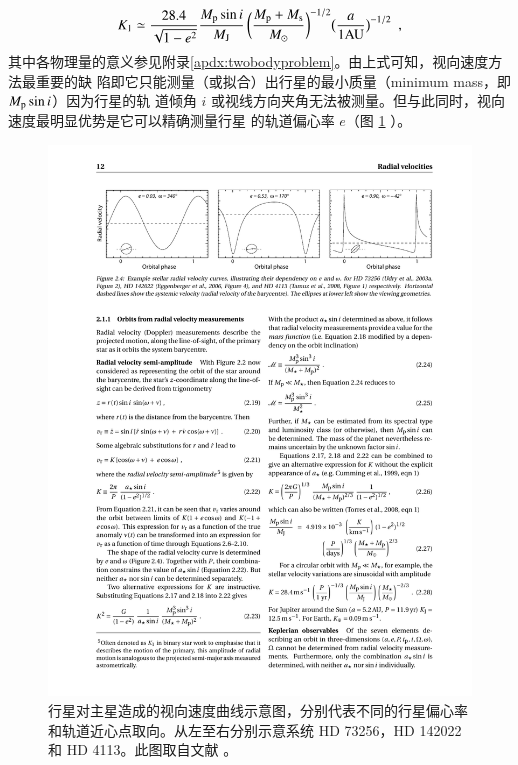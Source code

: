 \begin{equation}  \label{eq:rvk} 
K_1 \simeq \frac{28.4 }{\sqrt{1-e^2}} \frac{M_\mathrm{p}\sin i}{M_\mathrm{J}} \, \bigg(\frac{M_\mathrm{p}+M_\mathrm{s}}{M_\odot}\bigg)^{-1/2} \big(\frac{a}{1 \mathrm{AU}}\big)^{-1/2} \ \ ,
\end{equation}  
其中各物理量的意义参见附录\ref{apdx:twobodyproblem}。由上式可知，视向速度方法最重要的缺
陷即它只能测量（或拟合）出行星的最小质量（minimum mass，即$M_\mathrm{p}\sin i$）因为行星的轨
道倾角 $i$ 或视线方向夹角无法被测量。但与此同时，视向速度最明显优势是它可以精确测量行星
的轨道偏心率 $e$（图 \ref{fig:rvcurve} ）。

\begin{figure}[h!]
\centering
\includegraphics[width=1.0\textwidth]{figures/chapter1/fig5_rvcurve.pdf}
\caption[行星对主星造成的视向速度曲线示意图，从左至右分别代表不同的行星偏心率和轨道近心点取向。此图版权归 Perryman M. 所有。]{行星对主星造成的视向速度曲线示意图，分别代表不同的行星偏心率和轨道近心点取向。从左至右分别示意系统 HD 73256\cite{Udry2003HD73256}，HD 142022\cite{Eggenberger2006HD142022} 和 HD 4113\cite{Tamuz2008HD4113}。此图取自文献 。}
\label{fig:rvcurve}
\end{figure}

